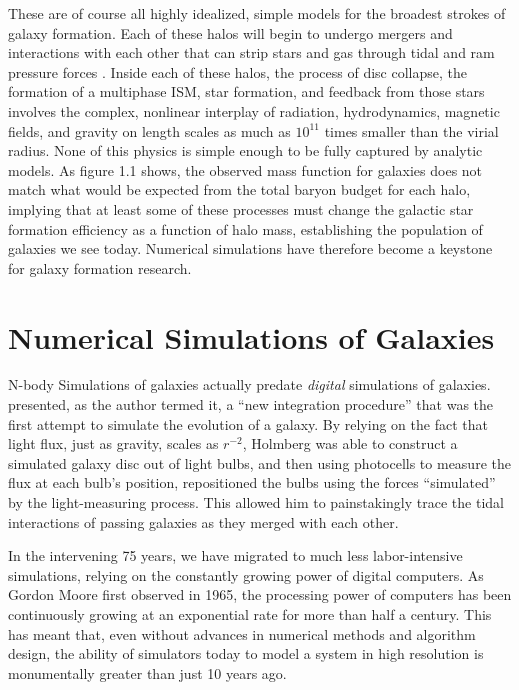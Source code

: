 These are of course all highly idealized, simple models for the broadest strokes
of galaxy formation.  Each of these halos will begin to undergo mergers and
interactions \citet{Navarro1993,Kauffmann1999,Cole2000} with each other that can
strip stars and gas through tidal and ram pressure forces
\citep{Gunn1972,Dressler1980}.  Inside each of these halos, the process of disc
collapse, the formation of a multiphase ISM, star formation, and feedback from
those stars involves the complex, nonlinear interplay of radiation,
hydrodynamics, magnetic fields, and gravity on length scales as much as
$10^{11}$ times smaller than the virial radius.  None of this physics is simple
enough to be fully captured by analytic models. As figure 1.1 shows, the
observed mass function for galaxies does not match what would be expected from
the total baryon budget for each halo, implying that at least some of these
processes must change the galactic star formation efficiency as a function of
halo mass, establishing the population of galaxies we see today.  Numerical
simulations have therefore become a keystone for galaxy formation research.


\section{Numerical Simulations of Galaxies}
N-body Simulations of galaxies actually predate {\it digital} simulations of
galaxies.  \citet{Holmberg1941} presented, as the author termed it, a ``new
integration procedure'' that was the first attempt to simulate the
evolution of a galaxy.  By relying on the fact that light flux, just as gravity,
scales as $r^{-2}$, Holmberg was able to construct a simulated galaxy disc out
of light bulbs, and then using photocells to measure the flux at each bulb's
position, repositioned the bulbs using the forces ``simulated'' by the
light-measuring process.  This allowed him to painstakingly trace the tidal
interactions of passing galaxies as they merged with each other.

In the intervening 75 years, we have migrated to much less labor-intensive
simulations, relying on the constantly growing power of digital computers.  As
Gordon Moore first observed in 1965, the processing power of computers has been
continuously growing at an exponential rate for more than half a century.  This
has meant that, even without advances in numerical methods and algorithm design,
the ability of simulators today to model a system in high resolution is
monumentally greater than just 10 years ago.  

